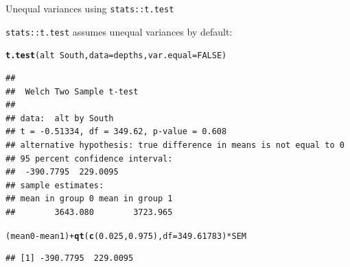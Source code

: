 \documentclass[handout]{beamer}\usepackage[]{graphicx}\usepackage[]{color}
\newcommand{\hlnum}[1]{\textcolor[rgb]{0.686,0.059,0.569}{#1}}%
\newcommand{\hlopt}[1]{\textcolor[rgb]{0,0,0}{#1}}%
\newcommand{\hlstd}[1]{\textcolor[rgb]{0.345,0.345,0.345}{#1}}%
\newcommand{\hlkwc}[1]{\textcolor[rgb]{0.333,0.667,0.333}{#1}}%
\newcommand{\hlkwd}[1]{\textcolor[rgb]{0.737,0.353,0.396}{\textbf{#1}}}%
\newenvironment{knitrout}{}{} %
\begin{document}
\begin{frame}[fragile]{Unequal variances using \texttt{stats::t.test}}

\texttt{stats::t.test} assumes unequal variances by default:


\begin{knitrout}\scriptsize
{}\color{fgcolor}
\begin{alltt}
\hlkwd{t.test}\hlstd{(alt} \hlopt{~} \hlstd{South,} \hlkwc{data} \hlstd{= depths,} \hlkwc{var.equal} \hlstd{=} \hlnum{FALSE}\hlstd{)}
\end{alltt}
\begin{verbatim}
## 
## 	Welch Two Sample t-test
## 
## data:  alt by South
## t = -0.51334, df = 349.62, p-value = 0.608
## alternative hypothesis: true difference in means is not equal to 0
## 95 percent confidence interval:
##  -390.7795  229.0095
## sample estimates:
## mean in group 0 mean in group 1 
##        3643.080        3723.965
\end{verbatim}
\begin{alltt}
\hlstd{(mean0} \hlopt{-} \hlstd{mean1)} \hlopt{+} \hlkwd{qt}\hlstd{(}\hlkwd{c}\hlstd{(}\hlnum{0.025}\hlstd{,} \hlnum{0.975}\hlstd{),} \hlkwc{df} \hlstd{=} \hlnum{349.61783}\hlstd{)} \hlopt{*} \hlstd{SEM}
\end{alltt}
\begin{verbatim}
## [1] -390.7795  229.0095
\end{verbatim}

\end{knitrout}


\end{frame}
\end{document}
